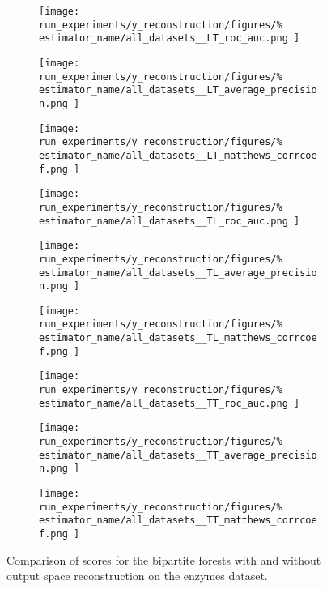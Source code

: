 \begin{figure*}
    \centering
    \begin{subfigure}{0.32\textwidth}
        \texttt{[image: 
            run\_experiments/y\_reconstruction/figures/\%
            estimator\_name/all\_datasets\_\_LT\_roc\_auc.png
        ]}
    \end{subfigure}
    \begin{subfigure}{0.32\textwidth}
        \texttt{[image: 
            run\_experiments/y\_reconstruction/figures/\%
            estimator\_name/all\_datasets\_\_LT\_average\_precision.png
        ]}
    \end{subfigure}
    \begin{subfigure}{0.32\textwidth}
        \texttt{[image: 
            run\_experiments/y\_reconstruction/figures/\%
            estimator\_name/all\_datasets\_\_LT\_matthews\_corrcoef.png
        ]}
    \end{subfigure}

    \begin{subfigure}{0.32\textwidth}
        \texttt{[image: 
            run\_experiments/y\_reconstruction/figures/\%
            estimator\_name/all\_datasets\_\_TL\_roc\_auc.png
        ]}
    \end{subfigure}
    \begin{subfigure}{0.32\textwidth}
        \texttt{[image: 
            run\_experiments/y\_reconstruction/figures/\%
            estimator\_name/all\_datasets\_\_TL\_average\_precision.png
        ]}
    \end{subfigure}
    \begin{subfigure}{0.32\textwidth}
        \texttt{[image: 
            run\_experiments/y\_reconstruction/figures/\%
            estimator\_name/all\_datasets\_\_TL\_matthews\_corrcoef.png
        ]}
    \end{subfigure}

    \begin{subfigure}{0.32\textwidth}
        \texttt{[image: 
            run\_experiments/y\_reconstruction/figures/\%
            estimator\_name/all\_datasets\_\_TT\_roc\_auc.png
        ]}
    \end{subfigure}
    \begin{subfigure}{0.32\textwidth}
        \texttt{[image: 
            run\_experiments/y\_reconstruction/figures/\%
            estimator\_name/all\_datasets\_\_TT\_average\_precision.png
        ]}
    \end{subfigure}
    \begin{subfigure}{0.32\textwidth}
        \texttt{[image: 
            run\_experiments/y\_reconstruction/figures/\%
            estimator\_name/all\_datasets\_\_TT\_matthews\_corrcoef.png
        ]}
    \end{subfigure}
    \caption{Comparison of scores for the bipartite forests with and without output space reconstruction on the enzymes dataset.}
    \label{fig:box_y_reconstruction}
\end{figure*}

